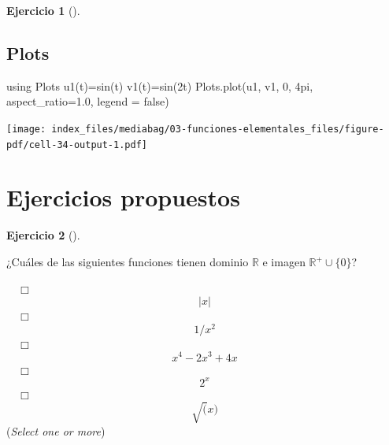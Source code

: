 \documentclass[
  a4paper,
]{scrreport}
\newenvironment{Shaded}{\begin{snugshade}}{\end{snugshade}}
\newcommand{\BuiltInTok}[1]{\textcolor[rgb]{0.00,0.23,0.31}{#1}}
\newcommand{\ConstantTok}[1]{\textcolor[rgb]{0.56,0.35,0.01}{#1}}
\newcommand{\FloatTok}[1]{\textcolor[rgb]{0.68,0.00,0.00}{#1}}
\newcommand{\FunctionTok}[1]{\textcolor[rgb]{0.28,0.35,0.67}{#1}}
\newcommand{\ImportTok}[1]{\textcolor[rgb]{0.00,0.46,0.62}{#1}}
\newcommand{\NormalTok}[1]{\textcolor[rgb]{0.00,0.23,0.31}{#1}}
\newcommand{\OperatorTok}[1]{\textcolor[rgb]{0.37,0.37,0.37}{#1}}
\theoremstyle{definition}
\newtheorem{exercise}{Ejercicio}[chapter]
\theoremstyle{remark}
\begin{document}
\begin{exercise}[]
\begin{tcolorbox}
\section{Plots}

\begin{Shaded}
\begin{Highlighting}[]
\ImportTok{using} \BuiltInTok{Plots}
\FunctionTok{u1}\NormalTok{(t)}\OperatorTok{=}\FunctionTok{sin}\NormalTok{(t)}
\FunctionTok{v1}\NormalTok{(t)}\OperatorTok{=}\FunctionTok{sin}\NormalTok{(}\FloatTok{2}\NormalTok{t)}
\NormalTok{Plots.}\FunctionTok{plot}\NormalTok{(u1, v1, }\FloatTok{0}\NormalTok{, }\FloatTok{4}\NormalTok{pi, aspect\_ratio}\OperatorTok{=}\FloatTok{1.0}\NormalTok{, legend }\OperatorTok{=} \ConstantTok{false}\NormalTok{)}
\end{Highlighting}
\end{Shaded}

\texttt{[image: index\_files/mediabag/03-funciones-elementales\_files/figure-pdf/cell-34-output-1.pdf]}

\end{tcolorbox}

\end{exercise}

\section{Ejercicios propuestos}\label{ejercicios-propuestos-1}

\begin{exercise}[]\protect\hypertarget{exr-dominio-imagen}{}\label{exr-dominio-imagen}

¿Cuáles de las siguientes funciones tienen dominio \(\mathbb{R}\) e
imagen \(\mathbb{R}^+\cup\{0\}\)?

${\quad\Box}$ $$|x|$$
${\quad\Box}$ $$1/x^2$$
${\quad\Box}$ $$x^4-2x^3+4x$$
${\quad\Box}$ $$2^x$$
${\quad\Box}$ $$\sqrt(x)$$
(\emph{Select one or more})

\end{exercise}
\end{document}
